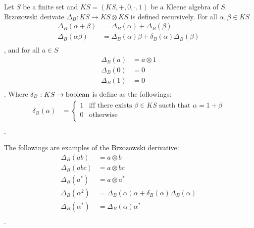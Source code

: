\begin{definition}
Let $S$ be a finite set and $KS=(KS, +, 0, \cdot, 1)$ be a Kleene algebra of $S$.
Brzozowski derivate $\Delta_B:KS\to KS\otimes KS$ is defined recursively.
For all $\alpha,\beta\in KS$
\begin{equation}\begin{split}
	\Delta_B(\alpha + \beta) &=  \Delta_B(\alpha) + \Delta_B(\beta) \\
	\Delta_B(\alpha \beta) &= \Delta_B(\alpha) \beta + \delta_B(\alpha) \Delta_B(\beta)\\
\end{split}\end{equation}
, and for all $a\in S$
\begin{equation}\begin{split}
	\Delta_B(a) &=  a\otimes 1 \\
	\Delta_B(0) &=  0 \\
	\Delta_B(1) &=  0 \\
\end{split}\end{equation}
. Where $\delta_B:KS\to \operatorname{boolean}$ is define as the followings:
\begin{equation}\begin{split}
	\delta_B(\alpha) &= \begin{cases}
		1 & \text{iff there exists } \beta\in KS \text{ sucth that } \alpha = 1 + \beta \\
		0 & \text{otherwise} \\
		\end{cases} \\
\end{split}\end{equation}
.
\end{definition}

The followings are examples of the Brzozowski derivative:
\begin{equation}\begin{split}
	\Delta_B(ab) &= a\otimes b \\
	\Delta_B(abc) &= a\otimes bc \\
	\Delta_B(a^*) &= a\otimes a^* \\
	\Delta_B(\alpha^2) &= \Delta_B(\alpha) \alpha + \delta_B(\alpha) \Delta_B(\alpha) \\
	\Delta_B(\alpha^*) &= \Delta_B(\alpha) \alpha^* \\
\end{split}\end{equation}
.

